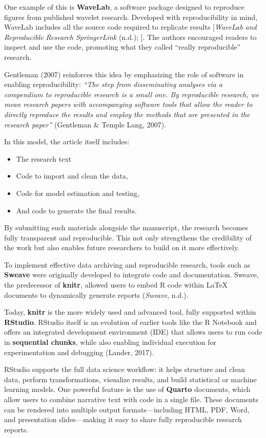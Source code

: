 \documentclass[
  british,
  a4paper,
]{article}
\begin{document}
One example of this is \textbf{WaveLab}, a software package designed to
reproduce figures from published wavelet research. Developed with
reproducibility in mind, WaveLab includes all the source code required
to replicate results {[}\emph{WaveLab and Reproducible Research
\textbar{} SpringerLink} (n.d.); {]}. The authors encouraged readers to
inspect and use the code, promoting what they called ``really
reproducible'' research.

Gentleman (2007) reinforces this idea by emphasizing the role of
software in enabling reproducibility: \emph{``The step from
disseminating analyses via a compendium to reproducible research is a
small one. By reproducible research, we mean research papers with
accompanying software tools that allow the reader to directly reproduce
the results and employ the methods that are presented in the research
paper''} (Gentleman \& Temple Lang, 2007).

In this model, the article itself includes:

\begin{itemize}
\item
  The research text
\item
  Code to import and clean the data,
\item
  Code for model estimation and testing,
\item
  And code to generate the final results.
\end{itemize}

By submitting such materials alongside the manuscript, the research
becomes fully transparent and reproducible. This not only strengthens
the credibility of the work but also enables future researchers to build
on it more effectively.

To implement effective data archiving and reproducible research, tools
such as \textbf{Sweave} were originally developed to integrate code and
documentation. Sweave, the predecessor of \textbf{knitr}, allowed users
to embed R code within LaTeX documents to dynamically generate reports
(\emph{Sweave}, n.d.).

Today, \textbf{knitr} is the more widely used and advanced tool, fully
supported within \textbf{RStudio}. RStudio itself is an evolution of
earlier tools like the R Notebook and offers an integrated development
environment (IDE) that allows users to run code in \textbf{sequential
chunks}, while also enabling individual execution for experimentation
and debugging (Lander, 2017).

RStudio supports the full data science workflow: it helps structure and
clean data, perform transformations, visualize results, and build
statistical or machine learning models. One powerful feature is the use
of \textbf{Quarto} documents, which allow users to combine narrative
text with code in a single file. These documents can be rendered into
multiple output formats---including HTML, PDF, Word, and presentation
slides---making it easy to share fully reproducible research reports.
\end{document}

